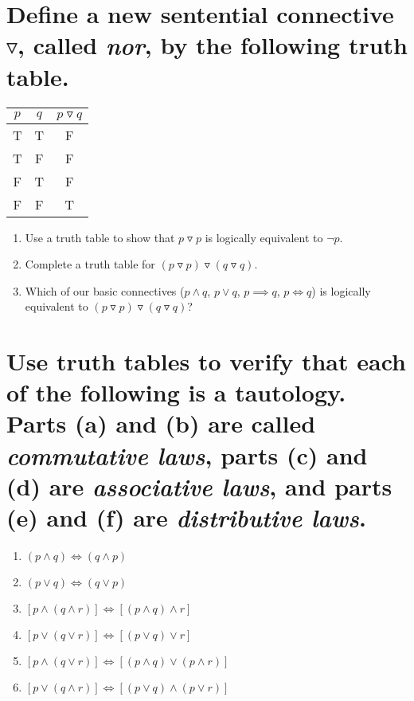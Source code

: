 \documentclass[11pt]{article} %
\begin{document}
\section{Define a new sentential connective $\triangledown$, called \textit{nor}, by the following truth table.}
	\begin{center}
	\begin{tabular}{|c|c|c|}
	\hline
	$p$ & $q$ & $p \triangledown q$\\
	\hline
	T & T & F\\
	T & F & F\\
	F & T & F\\
	F & F & T\\
	\hline
	\end{tabular}
	\end{center}
	\begin{enumerate}
	\item Use a truth table to show that $p \triangledown p$ is logically equivalent to $\neg p$.
	\item Complete a truth table for $(p \triangledown p) \triangledown (q \triangledown q)$.
	\item Which of our basic connectives ($p\land q$, $p\lor q$, $p\implies q$, $p\iff q$) is logically equivalent to $(p \triangledown p) \triangledown (q \triangledown q)$?
	\end{enumerate}
	
\section{Use truth tables to verify that each of the following is a tautology. Parts (a) and (b) are called \textit{commutative laws}, parts (c) and (d) are \textit{associative laws}, and parts (e) and (f) are \textit{distributive laws}.}
\begin{enumerate}
	\item $(p \land q) \iff (q \land p)$
	\item $(p \lor q) \iff (q \lor p)$
	\item $[p \land (q \land r)] \iff [(p\land q) \land r]$
	\item $[p \lor (q \lor r)] \iff [(p\lor q) \lor r]$
	\item $[p \land (q \lor r)] \iff [(p\land q)\lor(p\land r)]$
	\item $[p \lor (q \land r)] \iff [(p\lor q)\land(p\lor r)]$
\end{enumerate}
\end{document}
